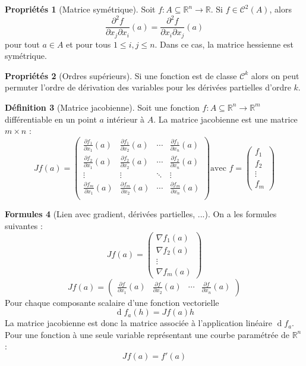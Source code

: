 \documentclass[11pt,a4paper]{article}
\theoremstyle{definition}
\newtheorem{mydef}{Définition}%
\newtheorem{myprop}[mydef]{Propriétés}
\newtheorem{myform}[mydef]{Formules}
\DeclareMathOperator{\diff}{d}
\newcommand{\dif}{\diff\!}
\newcommand{\pa}{\partial}
\newcommand{\R}{\mathbb{R}}
\begin{document}
\begin{myprop}[Matrice symétrique]
	Soit $f : A \subseteq \R^n \to \R$.
	Si $f \in \mathcal{C}^2(A)$, alors
	\[ \frac{\pa^2 f}{\pa x_j \pa x_i}(a) = \frac{\pa^2 f}{\pa x_i \pa x_j}(a) \]
	pour tout $a \in A$ et pour tous $1 \leq i,j \leq n$. Dans ce cas, la matrice hessienne est symétrique.
\end{myprop}

\begin{myprop}[Ordres supérieurs]
	Si une fonction est de classe $\mathcal{C}^k$ alors on peut permuter l'ordre de dérivation des variables pour les dérivées partielles d'ordre $k$.
\end{myprop}

\begin{mydef}[Matrice jacobienne]
	Soit une fonction $f : A \subseteq \R^n \to \R^m$ différentiable en un point $a$ intérieur à $A$. La matrice jacobienne est une matrice $m \times n$ :
	\[ Jf(a) =
	\begin{pmatrix}
		\frac{\pa f_1}{\pa x_1}(a) & \frac{\pa f_1}{\pa x_2}(a) & \cdots & \frac{\pa f_1}{\pa x_n}(a) \\
		\frac{\pa f_2}{\pa x_1}(a) & \frac{\pa f_2}{\pa x_2}(a) & \cdots & \frac{\pa f_2}{\pa x_n}(a) \\
		\vdots & \vdots & \ddots & \vdots \\
		\frac{\pa f_m}{\pa x_1}(a) & \frac{\pa f_m}{\pa x_2}(a) & \cdots & \frac{\pa f_m}{\pa x_n}(a) \\
	\end{pmatrix} \text{avec } f =
	\begin{pmatrix}
		f_1 \\ f_2 \\ \vdots \\ f_m
	\end{pmatrix} \]
\end{mydef}

\begin{myform}[Lien avec gradient, dérivées partielles, ...]
	On a les formules suivantes :
	\[ Jf(a) =
	\begin{pmatrix} \nabla f_1(a) \\ \nabla f_2(a) \\ \vdots \\ \nabla f_m(a)
	\end{pmatrix} \]
	\[ Jf(a) =
	\begin{pmatrix} \frac{\pa f}{\pa x_1}(a) & \frac{\pa f}{\pa x_2}(a) & \cdots & \frac{\pa f}{\pa x_n}(a)
	\end{pmatrix} \]
	Pour chaque composante scalaire d'une fonction vectorielle
	\[ \dif f_a(h) = Jf(a) h \]
	La matrice jacobienne est donc la matrice associée à l'application linéaire $\dif f_a$.
	Pour une fonction à une seule variable représentant une courbe paramétrée de $\R^n$ :
	\[ Jf(a) = f'(a) \]
\end{myform}
\end{document}
